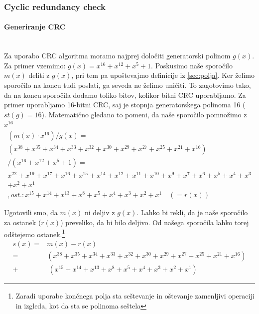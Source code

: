 \documentclass[12pt]{article}
\begin{document}
        \subsubsection{Cyclic redundancy check}
            \paragraph{Generiranje CRC} \mbox{}\\
            Za uporabo CRC algoritma moramo najprej določiti generatorski 
            polinom $g(x)$. Za primer vzemimo: $g(x)=x^{16}+x^{12}+x^5+1$.
            Poskusimo naše sporočilo $m(x)$ deliti z $g(x)$, pri tem pa 
            upoštevajmo definicije iz \ref{sec:polja}.
            Ker želimo sporočilo na koncu tudi poslati, ga seveda ne želimo 
            uničiti. To zagotovimo tako, da na koncu sporočila dodamo toliko
            bitov, kolikor bitni CRC uporabljamo. Za primer uporabljamo 16-bitni
            CRC, saj je stopnja generatorskega polinoma 16 ($st(g)=16$). 
            Matematično gledano to pomeni, da naše sporočilo pomnožimo z 
            $x^{16}$ 
            \begin{equation}
                \begin{split}
                    (m(x) \cdot x^{16})/g(x) =\\
                    (x^{38} + x^{35} + x^{34} + x^{33} + x^{32} +
                    x^{30} + x^{29} + x^{27} + x^{25} + x^{21} + x^{16})\\
                    /(x^{16} +x^{12} + x^5 + 1)=\\
                    x^{22} + x^{19} + x^{17} + x^{16} + x^{15} +
                    x^{14} + x^{12} + x^{11} + x^{10} + x^{9} + x^{7} + 
                    x^{6} + x^{5} + x^{4} + x^{3}\\ + x^{2} + x^{1}\\
                    , ost.: x^{15} + x^{14} + x^{13} + x^8 + x^5 + x^4 + x^3 + 
                    x^2 + x^1 \quad (=r(x))
                \end{split}
            \end{equation}

            Ugotovili smo, da $m(x)$ ni deljiv z $g(x)$. Lahko bi rekli, da je 
            naše sporočilo za ostanek ($r(x)$) preveliko, da bi bilo deljivo. 
            Od našega sporočila lahko torej odštejemo ostanek.\footnote{Zaradi 
            uporabe končnega polja sta seštevanje in oštevanje zamenljivi 
            operaciji in izgleda, kot da sta se polinoma seštela}
            \begin{equation}
                \begin{split}
                    s(x) = & m(x) - r(x)\\
                    = & (x^{38} + x^{35} + x^{34} + x^{33} + x^{32} +
                    x^{30} + x^{29} + x^{27} + x^{25} + x^{21} + x^{16})\\
                    + & \: (x^{15} + x^{14} + x^{13} + x^8 + x^5 + x^4 + x^3 + 
                    x^2 + x^1)                    
                \end{split}
            \end{equation}
\end{document}

